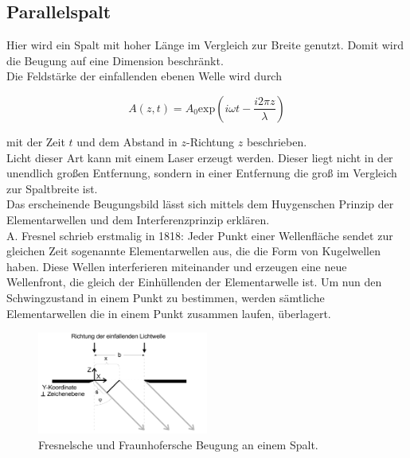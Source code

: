     \subsection{Parallelspalt}

        \noindent Hier wird ein Spalt mit hoher Länge im Vergleich zur Breite genutzt. Domit wird die Beugung auf eine Dimension beschränkt.\\
        Die Feldstärke der einfallenden ebenen Welle wird durch 

        \begin{equation*}
            A(z,t) = A_0 \text{exp}\left(i \omega t - \frac{i 2\pi z}{\lambda}\right)
        \end{equation*}

        \noindent mit der Zeit $t$ und dem Abstand in $z$-Richtung $z$ beschrieben.\\ Licht dieser Art kann mit einem Laser erzeugt werden. 
        Dieser liegt nicht in der unendlich großen Entfernung, sondern in einer Entfernung die groß im Vergleich zur Spaltbreite ist.\\
        Das erscheinende Beugungsbild lässt sich mittels dem Huygenschen Prinzip der Elementarwellen und dem Interferenzprinzip 
        erklären.\\ A. Fresnel schrieb erstmalig in 1818: Jeder Punkt einer Wellenfläche sendet zur gleichen Zeit sogenannte Elementarwellen aus, 
        die die Form von Kugelwellen haben. Diese Wellen interferieren miteinander und erzeugen eine neue Wellenfront, die gleich der Einhüllenden
        der Elementarwelle ist. Um nun den Schwingzustand in einem Punkt zu bestimmen, werden sämtliche Elementarwellen die in einem Punkt zusammen 
        laufen, überlagert.

        \begin{figure}[ht]
            \centering
            \includegraphics[width=0.5\textwidth]{latex/images/einzel.PNG}
            \caption{Fresnelsche und Fraunhofersche Beugung an einem Spalt\protect \cite{V406}.}
            \label{img:einzel}
        \end{figure}


